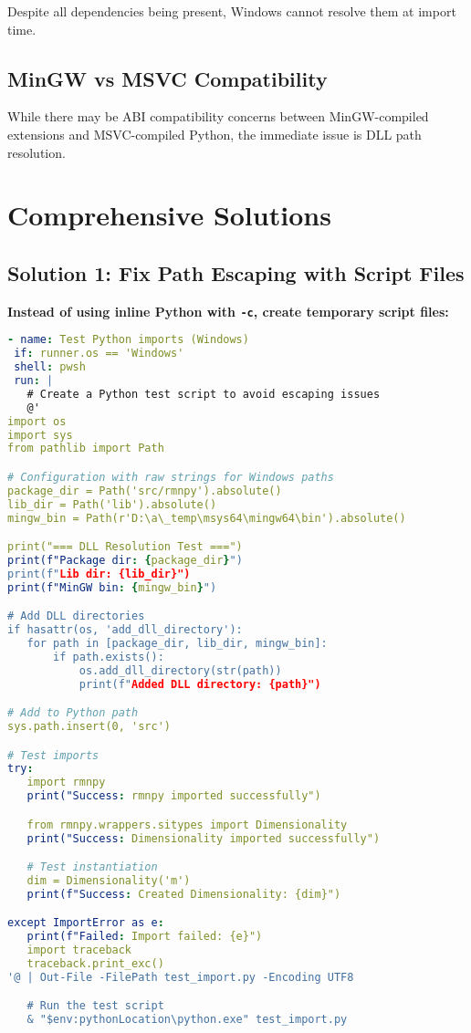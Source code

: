 \documentclass[11pt]{article}
\begin{document}
Despite all dependencies being present, Windows cannot resolve them at import time.

\subsection{MinGW vs MSVC Compatibility}
While there may be ABI compatibility concerns between MinGW-compiled extensions and MSVC-compiled Python, the immediate issue is DLL path resolution.

\section{Comprehensive Solutions}

\subsection{Solution 1: Fix Path Escaping with Script Files}

\textbf{Instead of using inline Python with \texttt{-c}, create temporary script files:}

\begin{lstlisting}[language=yaml]
- name: Test Python imports (Windows)
 if: runner.os == 'Windows'
 shell: pwsh
 run: |
   # Create a Python test script to avoid escaping issues
   @'
import os
import sys
from pathlib import Path

# Configuration with raw strings for Windows paths
package_dir = Path('src/rmnpy').absolute()
lib_dir = Path('lib').absolute()
mingw_bin = Path(r'D:\a\_temp\msys64\mingw64\bin').absolute()

print("=== DLL Resolution Test ===")
print(f"Package dir: {package_dir}")
print(f"Lib dir: {lib_dir}")
print(f"MinGW bin: {mingw_bin}")

# Add DLL directories
if hasattr(os, 'add_dll_directory'):
   for path in [package_dir, lib_dir, mingw_bin]:
       if path.exists():
           os.add_dll_directory(str(path))
           print(f"Added DLL directory: {path}")

# Add to Python path
sys.path.insert(0, 'src')

# Test imports
try:
   import rmnpy
   print("Success: rmnpy imported successfully")

   from rmnpy.wrappers.sitypes import Dimensionality
   print("Success: Dimensionality imported successfully")

   # Test instantiation
   dim = Dimensionality('m')
   print(f"Success: Created Dimensionality: {dim}")

except ImportError as e:
   print(f"Failed: Import failed: {e}")
   import traceback
   traceback.print_exc()
'@ | Out-File -FilePath test_import.py -Encoding UTF8

   # Run the test script
   & "$env:pythonLocation\python.exe" test_import.py
\end{lstlisting}
\end{document}
